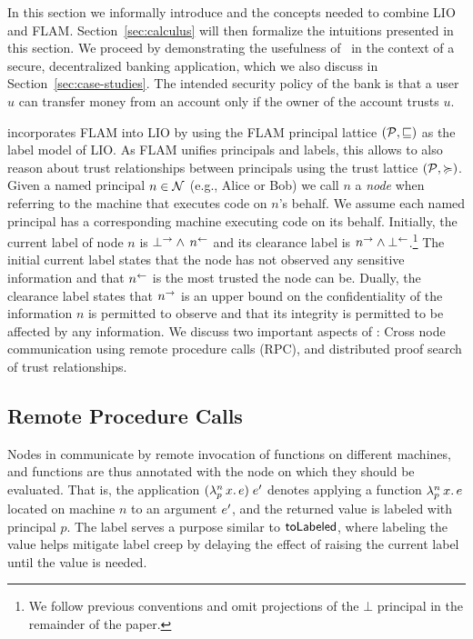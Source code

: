 In this section we informally introduce \lang{} and the concepts needed to combine LIO and FLAM. Section~\ref{sec:calculus} will then formalize the intuitions presented in this section. We proceed by demonstrating the usefulness of \lang{}\ in the context of a secure, decentralized banking application, which we also discuss in Section~\ref{sec:case-studies}. The intended security policy of the bank is that a user $u$ can transfer money from an account only if the owner of the account trusts $u$.

\lang{} incorporates FLAM into LIO by using the FLAM principal lattice $(\mathcal{P}, \sqsubseteq)$ as the label model of LIO. As FLAM unifies principals and labels, this allows \lang{} to also reason about trust relationships between principals using the trust lattice $(\mathcal{P}, \succcurlyeq)$.
Given a named principal $n \in \mathcal{N}$ (e.g., Alice or Bob) we call $n$ a \emph{node} when referring to the machine that executes code on $n$'s behalf. We assume each named principal has a corresponding machine executing code on its behalf. Initially, the current label of node $n$ is $\bot^{\rightarrow} \wedge\, n^{\leftarrow}$ and its clearance label is $n^{\rightarrow} \wedge \bot^{\leftarrow}$.\footnote{We follow previous conventions \cite{Arden:2015:FA:2859845.2859998} and omit projections of the $\bot$ principal in the remainder of the paper.} The initial current label states that the node has not observed any sensitive information and that $n^{\leftarrow}$ is the most trusted the node can be. Dually, the clearance label states that $n^{\rightarrow}$ is an upper bound on the confidentiality of the information $n$ is permitted to observe and that its integrity is permitted to be affected by any information. We discuss two important aspects of \lang: Cross node communication using remote procedure calls (RPC), and distributed proof search of trust relationships.

\subsection{Remote Procedure Calls}
Nodes in \lang{} communicate by remote invocation of functions on different machines, and functions are thus annotated with the node on which they should be evaluated. That is, the application $(\lambda^{n}_{p}\,x.\,e)\;e'$ denotes applying a function $\lambda^{n}_{p}\,x.\,e$ located on machine $n$ to an argument $e'$, and the returned value is labeled with principal $p$. The label serves a purpose similar to $\mathsf{toLabeled}$, where labeling the value helps mitigate label creep by delaying the effect of raising the current label until the value is needed.

